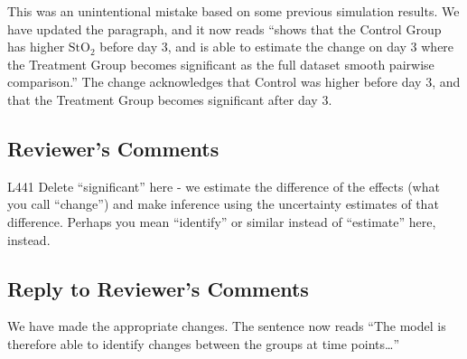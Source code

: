 \documentclass[
]{article}
\begin{document}
This was an unintentional mistake based on some previous simulation results. We have updated the paragraph, and it now reads ``shows that the Control Group has higher \(\mbox{StO}_2\) before day 3, and is able to estimate the change on day 3 where the Treatment Group becomes significant as the full dataset smooth pairwise comparison.'' The change acknowledges that Control was higher before day 3, and that the Treatment Group becomes significant after day 3.

\hypertarget{reviewers-comments-36}{%
\subsection{Reviewer's Comments}\label{reviewers-comments-36}}

L441 Delete ``significant'' here - we estimate the difference of the effects (what you call ``change'') and make inference using the uncertainty estimates of that difference. Perhaps you mean ``identify'' or similar instead of ``estimate'' here, instead.

\hypertarget{section-37}{%
\subsection{\texorpdfstring{\textcolor{reviewersblue} {Reply to Reviewer's Comments}}{}}\label{section-37}}

We have made the appropriate changes. The sentence now reads ``The model is therefore able to identify changes between the groups at time points\ldots{}''
\end{document}
